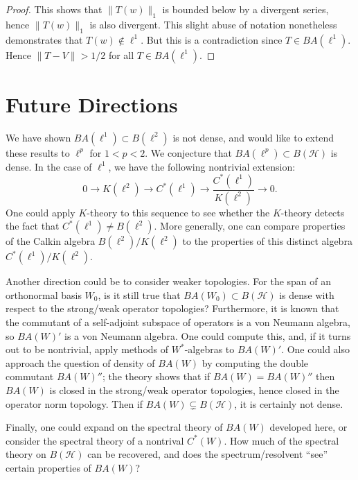 \documentclass{dcthesis}
\numberwithin{equation}{section}
\numberwithin{equation}{section}
\theoremstyle{definition}
\begin{document}
\begin{proof}
	This shows that $\|T(w)\|_1$ is bounded below by a divergent series, hence $\|T(w)\|_1$ is also divergent. This slight abuse of notation nonetheless demonstrates that $T(w)\not\in\ell^1$. But this is a contradiction since $T\in BA(\ell^1)$. Hence $\|T-V\| > 1/2$ for all $T\in BA(\ell^1)$.
\end{proof}



\chapter{Future Directions}

We have shown $BA(\ell^1)\subset B(\ell^2)$ is not dense, and would like to extend these results to $\ell^p$ for $1<p<2$. We conjecture that $BA(\ell^p)\subset B(\mathcal{H})$ is dense. In the case of $\ell^1$, we have the following nontrivial extension:
\begin{equation*}
	0 \to K(\ell^2) \to C^\ast(\ell^1) \to \frac{C^\ast(\ell^1)}{K(\ell^2)} \to 0.
\end{equation*}
One could apply $K$-theory to this sequence to see whether the $K$-theory detects the fact that $C^\ast(\ell^1)\neq B(\ell^2)$. More generally, one can compare properties of the Calkin algebra $B(\ell^2)/K(\ell^2)$ to the properties of this distinct algebra $C^\ast(\ell^1)/K(\ell^2)$.

Another direction could be to consider weaker topologies. For the span of an orthonormal basis $W_0$, is it still true that $BA(W_0)\subset B(\mathcal{H})$ is dense with respect to the strong/weak operator topologies? Furthermore, it is known that the commutant of a self-adjoint subspace of operators is a von Neumann algebra, so $BA(W)'$ is a von Neumann algebra. One could compute this, and, if it turns out to be nontrivial, apply methods of $W^\ast$-algebras to $BA(W)'$. One could also approach the question of density of $BA(W)$ by computing the double commutant $BA(W)''$; the theory shows that if $BA(W)=BA(W)''$ then $BA(W)$ is closed in the strong/weak operator topologies, hence closed in the operator norm topology. Then if $BA(W)\subsetneq B(\mathcal{H})$, it is certainly not dense.

Finally, one could expand on the spectral theory of $BA(W)$ developed here, or consider the spectral theory of a nontrival $C^\ast(W)$. How much of the spectral theory on $B(\mathcal{H})$ can be recovered, and does the spectrum/resolvent ``see'' certain properties of $BA(W)$?

%

\backmatter

%


\end{document}

